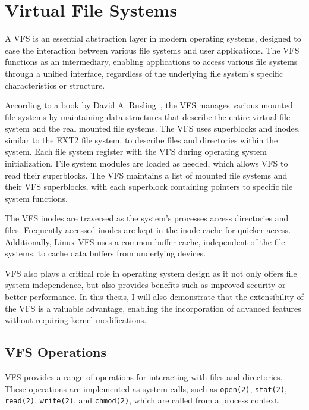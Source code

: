 \section{Virtual File Systems}\label{sec:virtual-file-systems}

A VFS is an essential abstraction layer in modern operating systems, designed to ease the interaction between various file systems and user applications.
The VFS functions as an intermediary, enabling applications to access various file systems through a unified interface, regardless of the underlying file system's specific characteristics or structure.

According to a book by David A. Rusling~\cite{rusling-linux}, the VFS manages various mounted file systems by maintaining data structures that describe the entire virtual file system and the real mounted file systems.
The VFS uses superblocks and inodes, similar to the EXT2 file system, to describe files and directories within the system.
Each file system register with the VFS during operating system initialization.
File system modules are loaded as needed, which allows VFS to read their superblocks.
The VFS maintains a list of mounted file systems and their VFS superblocks, with each superblock containing pointers to specific file system functions.

The VFS inodes are traversed as the system's processes access directories and files.
Frequently accessed inodes are kept in the inode cache for quicker access.
Additionally, Linux VFS uses a common buffer cache, independent of the file systems, to cache data buffers from underlying devices.

VFS also plays a critical role in operating system design as it not only offers file system independence, but also provides benefits such as improved security or better performance.
In this thesis, I will also demonstrate that the extensibility of the VFS is a valuable advantage, enabling the incorporation of advanced features without requiring kernel modifications.

\subsection{VFS Operations}\label{subsec:vfs-operations}

VFS provides a range of operations for interacting with files and directories.
These operations are implemented as system calls, such as \texttt{open(2)}, \texttt{stat(2)}, \texttt{read(2)}, \texttt{write(2)}, and \texttt{chmod(2)}, which are called from a process context.

